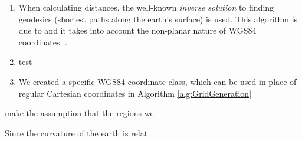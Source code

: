 \begin{enumerate}
    \item When calculating distances, the well-known \textit{inverse solution} to finding geodesics (shortest paths along the earth's surface) is used. This algorithm is due to \citeauthor{Vincenty1975DirectEquations} and it takes into account the non-planar nature of WGS84 coordinates.  \cite{Vincenty1975DirectEquations}.
    \item test
    \item We created a specific WGS84 coordinate class, which can be used in place of regular Cartesian coordinates in Algorithm \ref{alg:GridGeneration}
\end{enumerate}

make the assumption that the regions we

Since the curvature of the earth is relat

















